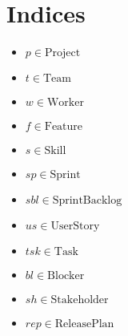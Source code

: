 \documentclass[11pt]{article}
\begin{document}
\section{Indices}
\begin{itemize}
    \item $p \in \text{Project}$
    \item $t \in \text{Team}$
    \item $w \in \text{Worker}$
    \item $f \in \text{Feature}$
    \item $s \in \text{Skill}$
    \item $sp \in \text{Sprint}$
    \item $sbl \in \text{SprintBacklog}$
    \item $us \in \text{UserStory}$
    \item $tsk \in \text{Task}$
    \item $bl \in \text{Blocker}$
    \item $sh \in \text{Stakeholder}$
    \item $rep \in \text{ReleasePlan}$
\end{itemize}
\end{document}
